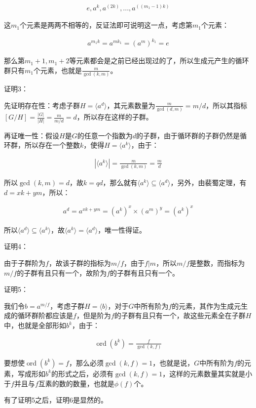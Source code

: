 \documentclass[12pt, a4paper, oneside]{ctexart}
\theoremstyle{definition}
\begin{document}
\begin{align*}
e, a^k, a^{(2k)}, ..., a^{((m_1-1)k)}
\end{align*}

这$m_1$个元素是两两不相等的，反证法即可说明这一点，考虑第$m_1$个元素：

\begin{align*}
a^{m_1k}=a^{mk_1}=(a^m)^{k_1}=e
\end{align*}

那么第$m_1+1,m_1+2$等元素都会是之前已经出现过的了，所以生成元产生的循环群只有$m_1$个元素，也就是$\frac{m}{\gcd(k,m)}$。

证明3：

先证明存在性：考虑子群$H=\langle a^d\rangle$，其元素数量为$\frac{m}{\gcd(d,m)}=m/d$，所以其指标$[G/H]=\frac{|G|}{|H|}=\frac{m}{m/d}=d$，所以存在这样的子群。

再证唯一性：假设$H$是$G$的任意一个指数为$d$的子群，由于循环群的子群仍然是循环群，所以存在一个整数$k$，使得$H=\langle a^k\rangle$，由于：

\begin{align*}
	|\langle a^k \rangle|=\frac{m}{\gcd(k,m)}=\frac{m}{d}
\end{align*}

所以$\gcd(k,m)=d$，故$k=qd$，那么就有$\langle a^k\rangle\subseteq \langle a^d\rangle$，另外，由裴蜀定理，有$d=xk+ym$，所以：

\begin{align*}
	a^d=a^{xk+ym}=(a^k)^x\times (a^m)^y=(a^k)^x
\end{align*}

所以$\langle a^d\rangle\subseteq \langle a^k\rangle$，故$\langle a^k\rangle=\langle a^d\rangle$，唯一性得证。

证明4：

由于子群阶为$f$，故该子群的指标为$m/f$，由于$f|m$，所以$m/f$是整数，而指标为$m/f$的子群有且只有一个，故阶为$f$的子群有且只有一个。

证明5：

我们令$b=a^{m/f}$，考虑子群$H=\langle b\rangle$，对于$G$中所有阶为$f$的元素，其作为生成元生成的循环群阶都应该是$f$，但是阶为$f$的子群有且只有一个，故这些元素全在子群$H$中，也就是全部形如$b^k$，由于：

\begin{align*}
\operatorname{ord}(b^k)=\frac{f}{\gcd(k,f)}
\end{align*}

要想使$\operatorname{ord}(b^k)=f$，那么必须$\gcd(k,f)=1$，也就是说，$G$中所有阶为$f$的元素，写成形如$b^k$的形式之后，必须有$\gcd(k,f)=1$，这样的元素数量其实就是小于$f$并且与$f$互素的数的数量，也就是$\phi(f)$个。

有了证明5之后，证明6是显然的。
\end{document}
